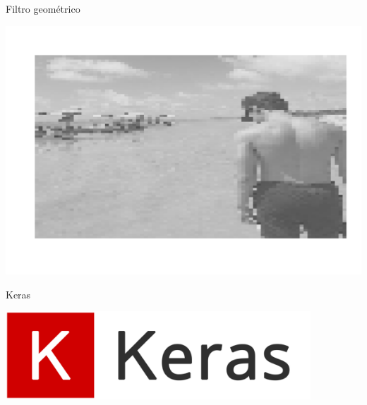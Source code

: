 \documentclass[
  ignorenonframetext,
]{beamer}
\newenvironment{Shaded}{\begin{snugshade}}{\end{snugshade}}
\newcommand{\DataTypeTok}[1]{\textcolor[rgb]{0.13,0.29,0.53}{#1}}
\newcommand{\DecValTok}[1]{\textcolor[rgb]{0.00,0.00,0.81}{#1}}
\newcommand{\KeywordTok}[1]{\textcolor[rgb]{0.13,0.29,0.53}{\textbf{#1}}}
\newcommand{\NormalTok}[1]{#1}
\newcommand{\OperatorTok}[1]{\textcolor[rgb]{0.81,0.36,0.00}{\textbf{#1}}}
\newcommand{\OtherTok}[1]{\textcolor[rgb]{0.56,0.35,0.01}{#1}}
\newcommand{\StringTok}[1]{\textcolor[rgb]{0.31,0.60,0.02}{#1}}
\begin{document}
\begin{frame}[fragile]{Filtro geométrico}
\protect\hypertarget{filtro-geomuxe9trico-2}{}

\small

\begin{Shaded}
\end{Shaded}

\includegraphics{SLIDES_files/figure-beamer/10.1-1.pdf}

\end{frame}

\begin{frame}{Keras}
\protect\hypertarget{keras}{}

\includegraphics[width=4.5in]{IMAGENS/Keras_logo}

\begin{center}
\tiny{}
\end{center}

\end{frame}
\end{document}
